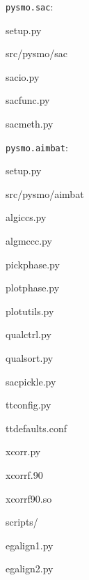 \documentclass[12pt, titlepage]{article}
\newenvironment{lyxcode}
{\begin{list}{}{
\setlength{\rightmargin}{\leftmargin}
\setlength{\listparindent}{0pt}%
\raggedright
\setlength{\itemsep}{0pt}
\setlength{\parsep}{0pt}
\normalfont\ttfamily}%
 \item[]}
{\end{list}}
\begin{document}
\begin{multicols}{2}
\begin{spacing}{1}

\texttt{pysmo.sac}:
\begin{lyxcode}
setup.py

src/pysmo/sac

\hspace{2em} sacio.py

\hspace{2em} sacfunc.py

\hspace{2em} sacmeth.py

\end{lyxcode}

\texttt{pysmo.aimbat}:


\begin{lyxcode}

setup.py


src/pysmo/aimbat

\hspace{2em} algiccs.py

\hspace{2em} algmccc.py

\hspace{2em} pickphase.py

\hspace{2em} plotphase.py

\hspace{2em} plotutils.py

\hspace{2em} qualctrl.py

\hspace{2em} qualsort.py

\hspace{2em} sacpickle.py

\hspace{2em} ttconfig.py

\hspace{2em} ttdefaults.conf

\hspace{2em} xcorr.py

\hspace{2em} xcorrf.90

\hspace{2em} xcorrf90.so


scripts/

\hspace{2em} egalign1.py

\hspace{2em} egalign2.py


\end{lyxcode}
\end{spacing}
\end{multicols}
\end{document}
